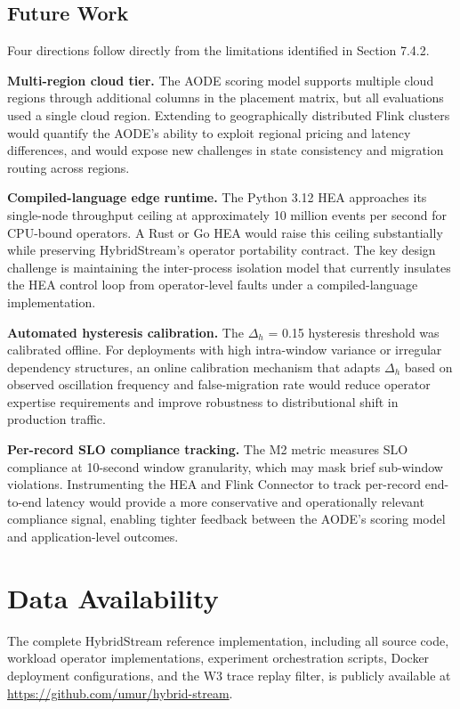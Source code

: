 \documentclass[preprint,review,12pt]{elsarticle}
\begin{document}
\subsection{Future Work}\label{future-work}

Four directions follow directly from the limitations identified in Section 7.4.2.

\textbf{Multi-region cloud tier.} The AODE scoring model supports multiple cloud regions through additional columns in the placement matrix, but all evaluations used a single cloud region. Extending to geographically distributed Flink clusters would quantify the AODE's ability to exploit regional pricing and latency differences, and would expose new challenges in state consistency and migration routing across regions.

\textbf{Compiled-language edge runtime.} The Python 3.12 HEA approaches its single-node throughput ceiling at approximately 10 million events per second for CPU-bound operators. A Rust or Go HEA would raise this ceiling substantially while preserving HybridStream's operator portability contract. The key design challenge is maintaining the inter-process isolation model that currently insulates the HEA control loop from operator-level faults under a compiled-language implementation.

\textbf{Automated hysteresis calibration.} The $\Delta_h$ = 0.15 hysteresis threshold was calibrated offline. For deployments with high intra-window variance or irregular dependency structures, an online calibration mechanism that adapts $\Delta_h$ based on observed oscillation frequency and false-migration rate would reduce operator expertise requirements and improve robustness to distributional shift in production traffic.

\textbf{Per-record SLO compliance tracking.} The M2 metric measures SLO compliance at 10-second window granularity, which may mask brief sub-window violations. Instrumenting the HEA and Flink Connector to track per-record end-to-end latency would provide a more conservative and operationally relevant compliance signal, enabling tighter feedback between the AODE's scoring model and application-level outcomes.



\section*{Data Availability}

The complete HybridStream reference implementation, including all source code, workload operator implementations, experiment orchestration scripts, Docker deployment configurations, and the W3 trace replay filter, is publicly available at \url{https://github.com/umur/hybrid-stream}.
\end{document}
